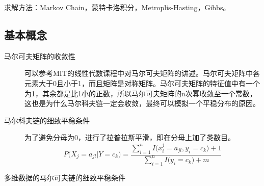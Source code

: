 \documentclass{ctexart}
\begin{document}
求解方法：Markov Chain，蒙特卡洛积分，Metroplis-Hasting，Gibbs。



\subsection{基本概念}
\label{comceptes}
\begin{description}
\item[马尔可夫矩阵的收敛性]
可以参考MIT的线性代数课程中对马尔可夫矩阵的讲述。马尔可夫矩阵中各元素大于0且小于1，而且矩阵是对称矩阵。马尔可夫矩阵的特征值中有一个为1，其余都是比1小的正数，所以马尔可夫矩阵的n次幂收敛至一个常数，这也是为什么马尔科夫链一定会收敛，最终可以模拟一个平稳分布的原因。

\item[马尔科夫链的细致平稳条件]
为了避免分母为0，进行了拉普拉斯平滑，即在分母上加了类数目。
\begin{equation}
P\big(X_j=a_{jl}|Y=c_k\big)=\frac{\sum\limits_{i=1}^{n}I\big(x_i^j=a_{jl},y_i=c_k\big)+1}{\sum\limits_{i=1}^{n}I\big(y_i=c_k\big)+m}
\end{equation}

\item[多维数据的马尔可夫链的细致平稳条件]

\end{description}



\end{document}
